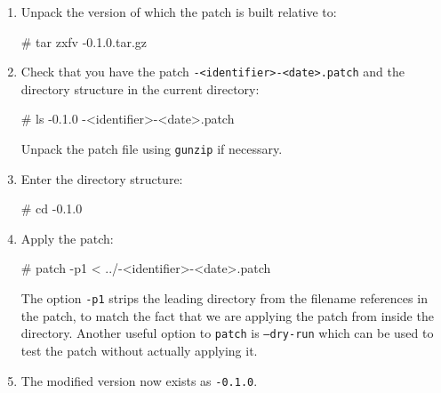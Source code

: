 \begin{enumerate}
\item
  Unpack the version of \package{} which the patch is built relative to:
  \begin{code}
    # tar zxfv \packagett{}-0.1.0.tar.gz
  \end{code}
\item
  Check that you have the patch \texttt{\packagett{}-<identifier>-<date>.patch} and the \package{}
  directory structure in the current directory:
  \begin{code}
    # ls
    \packagett{}-0.1.0
    \packagett{}-<identifier>-<date>.patch
  \end{code}
  Unpack the patch file using \texttt{gunzip} if necessary.
\item
  Enter the \package{} directory structure:
  \begin{code}
    # cd \packagett{}-0.1.0
  \end{code}
\item
  Apply the patch:
  \begin{code}
    # patch -p1 < ../\packagett{}-<identifier>-<date>.patch
  \end{code}
  The option \texttt{-p1} strips the leading directory from the filename
  references in the patch, to match the fact that we are applying the
  patch from inside the directory. Another useful option to
  \texttt{patch} is \texttt{--dry-run} which can be used to test the
  patch without actually applying it.
\item
  The modified version now exists as \texttt{\packagett{}-0.1.0}.
\end{enumerate}
